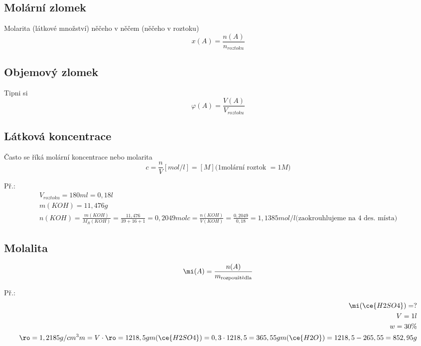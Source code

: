 \documentclass{article}
\begin{document}
\subsection{Molární zlomek}
Molarita (látkové množství) něčeho v něčem (něčeho v roztoku)
\[
x(A) = \frac{n(A)}{n_{roztoku}}
\]

\subsection{Objemový zlomek}
Tipni si
\[
\varphi (A) = \frac{V(A)}{V_{roztoku}}
\]

\subsection{Látková koncentrace}
Často se říká molární koncentrace nebo molarita
\[
c = \frac{n}{V} [mol/l]=[M] \text{(1molární roztok }=1M \text{)}
\]

Př.:
\begin{align*}
V_{roztoku} = 180 ml = 0,18 l\\
m(KOH) = 11,476 g \\
n(KOH) = \frac{m(KOH)}{M_R (KOH)} = \frac{11,476}{39+16+1} = 0,2049 mol
c = \frac{n(KOH)}{V(KOH)} = \frac{0,2049}{0,18} = 1,1385 mol/l \text{(zaokrouhlujeme na 4 des. místa)}
\end{align*}

\subsection{Molalita}
\[
    \mi (A) = \frac{n(A)}{m_{\text{rozpouštědla}}}
\]

Př.:
\begin{align*}
\mi (\ce{H2SO4}) = ?\\
V = 1l\\
w = 30\%\\
\ro = 1,2185 g/cm^3
m = V \cdot \ro  = 1218,5 g
m(\ce{H2SO4}) = 0,3 \cdot 1218,5 = 365,55 g
m(\ce{H2O}) = 1218,5 - 265,55 = 852,95 g
\end{align*}
\end{document}
